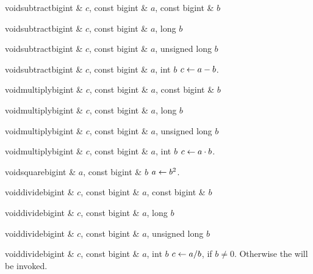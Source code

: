 \begin{fcode}{void}{subtract}{bigint & $c$, const bigint & $a$, const bigint & $b$}\end{fcode}
\begin{fcode}{void}{subtract}{bigint & $c$, const bigint & $a$, long $b$}\end{fcode}
\begin{fcode}{void}{subtract}{bigint & $c$, const bigint & $a$, unsigned long $b$}\end{fcode}
\begin{fcode}{void}{subtract}{bigint & $c$, const bigint & $a$, int $b$}
  $c \leftarrow a - b$.
\end{fcode}

\begin{fcode}{void}{multiply}{bigint & $c$, const bigint & $a$, const bigint & $b$}\end{fcode}
\begin{fcode}{void}{multiply}{bigint & $c$, const bigint & $a$, long $b$}\end{fcode}
\begin{fcode}{void}{multiply}{bigint & $c$, const bigint & $a$, unsigned long $b$}\end{fcode}
\begin{fcode}{void}{multiply}{bigint & $c$, const bigint & $a$, int $b$}
  $c \leftarrow a \cdot b$.
\end{fcode}

\begin{fcode}{void}{square}{bigint & $a$, const bigint & $b$}
  $a \leftarrow b^2$.
\end{fcode}

\begin{fcode}{void}{divide}{bigint & $c$, const bigint & $a$, const bigint & $b$}\end{fcode}
\begin{fcode}{void}{divide}{bigint & $c$, const bigint & $a$, long $b$}\end{fcode}
\begin{fcode}{void}{divide}{bigint & $c$, const bigint & $a$, unsigned long $b$}\end{fcode}
\begin{fcode}{void}{divide}{bigint & $c$, const bigint & $a$, int $b$}
  $c \leftarrow a / b$, if $b \neq 0$.  Otherwise the \LEH will be invoked.
\end{fcode}

